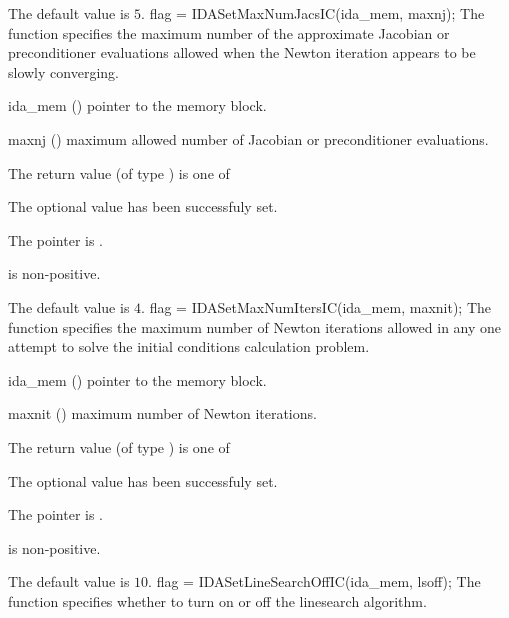 {
  The default value is $5$.
}
{
flag = IDASetMaxNumJacsIC(ida\_mem, maxnj);
}
{
  The function  specifies the maximum number
  of the approximate Jacobian or preconditioner evaluations allowed 
  when the Newton iteration appears to be slowly converging.
}
{
  \begin{args}
  \item[ida\_mem] ()
    pointer to the {\ida} memory block.
  \item[maxnj] ()
    maximum allowed number of Jacobian or preconditioner evaluations.
  \end{args}
}
{
  The return value  (of type ) is one of
  \begin{args}
  \item[\Id{IDA\_SUCCESS}] 
    The optional value has been successfuly set.
  \item[\Id{IDA\_MEM\_NULL}]
    The  pointer is .
  \item[\Id{IDA\_ILL\_INPUT}]
     is non-positive.
  \end{args}
}
{
  The default value is $4$.
}
{
flag = IDASetMaxNumItersIC(ida\_mem, maxnit);
}
{
  The function  specifies the maximum
  number of Newton iterations allowed in any one attempt to solve
  the initial conditions calculation problem.
}
{
  \begin{args}
  \item[ida\_mem] ()
    pointer to the {\ida} memory block.
  \item[maxnit] ()
    maximum number of Newton iterations.
  \end{args}
}
{
  The return value  (of type ) is one of
  \begin{args}
  \item[\Id{IDA\_SUCCESS}] 
    The optional value has been successfuly set.
  \item[\Id{IDA\_MEM\_NULL}]
    The  pointer is .
  \item[\Id{IDA\_ILL\_INPUT}]
     is non-positive.
  \end{args}
}
{
  The default value is $10$.
}
{
flag = IDASetLineSearchOffIC(ida\_mem, lsoff);
}
{
  The function  specifies whether to turn
  on or off the linesearch algorithm.
}
